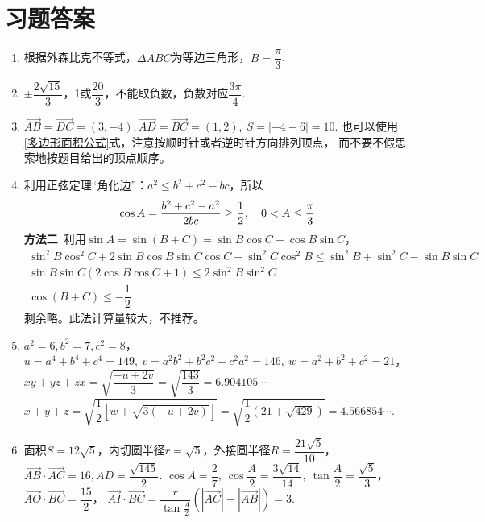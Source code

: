 \section{习题答案}
\begin{enumerate}[label={\textbf{\arabic*.}},leftmargin=
    \inteval{\myenumleftmargin}pt]
\item 
根据外森比克不等式，$ \Delta ABC $为等边三角形，$ B=\dfrac{\pi}{3} $. 

\item 
$ \pm\dfrac{2\sqrt{15}}{3} $，1或$ \dfrac{20}{3} $，不能取负数，负数对应$ \dfrac{3\pi}{4} $. 

\item 
$ \vec{AB}=\vec{DC}=(3,-4),
\vec{AD}=\vec{BC}=(1,2),\ S=|-4-6|=10 $. 也可以使用
\eqref{多边形面积公式}式，注意按顺时针或者逆时针方向排列顶点，
而不要不假思索地按题目给出的顶点顺序。

\item 利用正弦定理“角化边”：$ a^2\leq b^2+c^2-bc $，所以
\begin{gather*}
    \cos A=\dfrac{b^2+c^2-a^2}{2bc}\geq \dfrac{1}{2},
    \quad 0<A\leq \dfrac{\pi}{3}
\end{gather*}
\textbf{方法二}\ 利用$ \sin A=\sin(B+C)=\sin B\cos C+\cos B\sin C $，
\begin{gather*}
    \sin^2B\cos^2C+2\sin B\cos B\sin C\cos C+\sin^2C\cos^2B
    \leq \sin^2B+\sin^2C-\sin B\sin C \\
    \sin B\sin C(2\cos B\cos C+1)\leq 2\sin^2B \sin^2C \\
    \cos(B+C)\leq -\dfrac{1}{2} 
\end{gather*}
剩余略。此法计算量较大，不推荐。

\item 
$ a^2=6,b^2=7,c^2=8 $，\\
$ u=a^4+b^4+c^4=149,\ v=a^2b^2+b^2c^2+c^2a^2=146 ,\ w=a^2+b^2+c^2=21 $，\\
$ xy+yz+zx=\sqrt{\dfrac{-u+2v}{3}}=\sqrt{\dfrac{143}{3}}=6.904105\cdots $ \\
$ x+y+z=\sqrt{\dfrac{1}{2}[w+\sqrt{3(-u+2v)}]}=
\sqrt{\dfrac{1}{2}(21+\sqrt{429})}=4.566854\cdots $. 

\item 
面积$ S=12\sqrt{5} $，内切圆半径$ r=\sqrt{5}$，外接圆半径$ R=\dfrac{21
    \sqrt{5}}{10} $，$ \vec{AB}\cdot \vec{AC} = 16,
AD=\dfrac{\sqrt{145}}{2} $. 
$ \cos A=\dfrac{2}{7},\ \cos\dfrac{A}{2}=\dfrac{3\sqrt{14}}{14},\ \tan\dfrac{A}{2}=
\dfrac{\sqrt{5}}{3} $，
$ \vec{AO}\cdot\vec{BC}=\dfrac{15}{2} $，
$ \vec{AI}\cdot\vec{BC}=\dfrac{r}{\tan \frac{A}{2}}
\left(|\vec{AC}|-|\vec{AB}|\right)=3 $. 


\end{enumerate}
